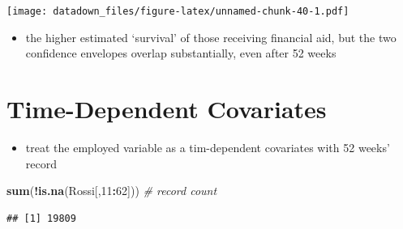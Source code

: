 \documentclass[
]{book}
\newenvironment{Shaded}{\begin{snugshade}}{\end{snugshade}}
\newcommand{\CommentTok}[1]{\textcolor[rgb]{0.56,0.35,0.01}{\textit{#1}}}
\newcommand{\DecValTok}[1]{\textcolor[rgb]{0.00,0.00,0.81}{#1}}
\newcommand{\KeywordTok}[1]{\textcolor[rgb]{0.13,0.29,0.53}{\textbf{#1}}}
\newcommand{\NormalTok}[1]{#1}
\newcommand{\OperatorTok}[1]{\textcolor[rgb]{0.81,0.36,0.00}{\textbf{#1}}}
\providecommand{\tightlist}{%
  \setlength{\itemsep}{0pt}\setlength{\parskip}{0pt}}
\begin{document}
\texttt{[image: datadown\_files/figure-latex/unnamed-chunk-40-1.pdf]}

\begin{itemize}
\tightlist
\item
  the higher estimated `survival' of those receiving financial aid, but the two confidence envelopes overlap substantially, even after 52 weeks
\end{itemize}

\hypertarget{time-dependent-covariates}{%
\section{Time-Dependent Covariates}\label{time-dependent-covariates}}

\begin{itemize}
\tightlist
\item
  treat the employed variable as a tim-dependent covariates with 52 weeks' record
\end{itemize}

\begin{Shaded}
\begin{Highlighting}[]
\KeywordTok{sum}\NormalTok{(}\OperatorTok{!}\KeywordTok{is.na}\NormalTok{(Rossi[,}\DecValTok{11}\OperatorTok{:}\DecValTok{62}\NormalTok{])) }\CommentTok{# record count}
\end{Highlighting}
\end{Shaded}

\begin{verbatim}
## [1] 19809
\end{verbatim}
\end{document}
